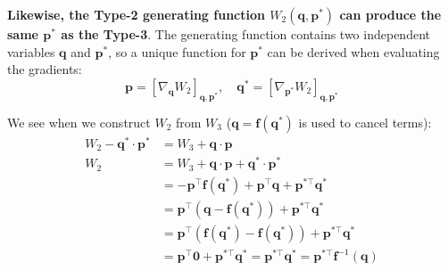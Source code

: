 \documentclass[titlepage]{article}
\begin{document}
\begin{mdframed}[linewidth=1pt, innertopmargin=10pt, innerbottommargin=10pt]
	\textbf{Likewise, the Type-2 generating function $W_2(\boldsymbol{q},\boldsymbol{p}^*)$ can produce the same $\boldsymbol{p}^*$ as the Type-3}. The generating function contains two independent variables $\boldsymbol{q}$ and $\boldsymbol{p}^*$, so a unique function for $\boldsymbol{p}^*$ can be derived when evaluating the gradients:
	\begin{equation}
		\boldsymbol{p}=\left[\nabla_{\boldsymbol{q}}W_2\right]_{\boldsymbol{q},\boldsymbol{p}^*},\quad\boldsymbol{q}^*=\left[\nabla_{\boldsymbol{p}^*}W_2\right]_{\boldsymbol{q},\boldsymbol{p}^*}
	\end{equation}
\end{mdframed}

We see when we construct $W_2$ from $W_3$ ($\boldsymbol{q}=\boldsymbol{f}(\boldsymbol{q}^*)$ is used to cancel terms):
\begin{equation}
	\begin{split}
		W_2-\boldsymbol{q}^*\cdot\boldsymbol{p}^*&=W_3+\boldsymbol{q}\cdot\boldsymbol{p} \\
		W_2&=W_3+\boldsymbol{q}\cdot\boldsymbol{p}+\boldsymbol{q}^*\cdot\boldsymbol{p}^* \\
		&=-\boldsymbol{p}^\top\boldsymbol{f}(\boldsymbol{q}^*)+\boldsymbol{p}^\top\boldsymbol{q}+\boldsymbol{p}^{*\top}\boldsymbol{q}^* \\
		&=\boldsymbol{p}^\top\left(\boldsymbol{q}-\boldsymbol{f}(\boldsymbol{q}^*)\right)+\boldsymbol{p}^{*\top}\boldsymbol{q}^* \\
		&=\boldsymbol{p}^\top\left(\boldsymbol{f}(\boldsymbol{q}^*)-\boldsymbol{f}(\boldsymbol{q}^*)\right)+\boldsymbol{p}^{*\top}\boldsymbol{q}^* \\
		&=\boldsymbol{p}^\top\boldsymbol{0}+\boldsymbol{p}^{*\top}\boldsymbol{q}^*=\boldsymbol{p}^{*\top}\boldsymbol{q}^*=\boldsymbol{p}^{*\top}\boldsymbol{f}^{-1}(\boldsymbol{q})
	\end{split}
\end{equation}
\end{document}
